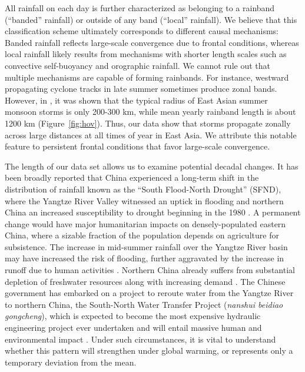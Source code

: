 \documentclass[9pt,twocolumn,twoside,lineno]{pnas-new}
\begin{document}
	 All rainfall on each day is further characterized as belonging to a rainband (``banded'' rainfall) or outside of any band (``local'' rainfall). We believe that this classification scheme ultimately corresponds to different causal mechanisms: Banded rainfall reflects large-scale convergence due to frontal conditions, whereas local rainfall likely results from mechanisms with shorter length scales such as convective self-buoyancy and orographic rainfall. We cannot rule out that multiple mechanisms are capable of forming rainbands. For instance, westward propagating cyclone tracks in late summer sometimes produce zonal bands. However, in \citet{Day2015}, it was shown that the typical radius of East Asian summer monsoon storms is only 200-300 km, while mean yearly rainband length is about 1200 km (Figure~\ref{fig:hov}). Thus, our data show that storms propagate zonally across large distances at all times of year in East Asia. We attribute this notable feature to persistent frontal conditions that favor large-scale convergence.
	 
	 The length of our data set allows us to examine potential decadal changes. It has been broadly reported that China experienced a long-term shift in the distribution of rainfall known as the ``South Flood-North Drought'' (SFND), where the Yangtze River Valley witnessed an uptick in flooding and northern China an increased susceptibility to drought beginning in the 1980 \citep{Hu1997,Gong2002,Nigam2013}. A permanent change would have major humanitarian impacts on densely-populated eastern China, where a sizable fraction of the population depends on agriculture for subsistence. The increase in mid-summer rainfall over the Yangtze River basin may have increased the risk of flooding, further aggravated by the increase in runoff due to human activities \citep{Gemmer2008}. Northern China already suffers from substantial depletion of freshwater resources along with increasing demand \citep{Currell2012,Gleeson2012}. The Chinese government has embarked on a project to reroute water from the Yangtze River to northern China, the South-North Water Transfer Project (\textit{nanshui beidiao gongcheng}), which is expected to become the most expensive hydraulic engineering project ever undertaken and will entail massive human and environmental impact \citep{Berkoff2003,Magee2011}. Under such circumstances, it is vital to understand whether this pattern will strengthen under global warming, or represents only a temporary deviation from the mean. 
	 
\end{document}
